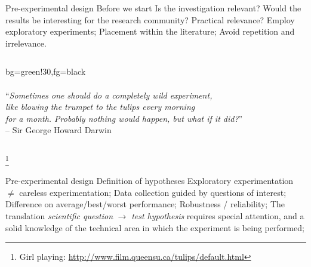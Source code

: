 \documentclass[t]{beamer}
\begin{document}
\begin{ftst}
{Pre-experimental design}
{Before we start}
\bitems Is the investigation relevant?
	\spitem Would the results be interesting for the research community?
	\spitem Practical relevance?
	\bitems Employ exploratory experiments;\eitem
	\spitem Placement within the literature;
	\bitems Avoid repetition and irrelevance.\eitem
\eitem
\begin{columns}[T]
\begin{colorblock}{}{bg=green!30,fg=black}
{\ \\\ \\\scriptsize``\textit{Sometimes one should do a completely wild experiment,\\like blowing the trumpet to the tulips every morning\\for a month. Probably nothing would happen, but what if it did?}''\\}
{\tiny -- Sir George Howard Darwin}
\end{colorblock}
\end{columns}
\let\thefootnote\relax\footnote{\tiny Girl playing: \url{http://www.film.queensu.ca/tulips/default.html}}
\end{ftst}


\begin{ftst}
{Pre-experimental design}
{Definition of hypotheses}
\bitems Exploratory experimentation $\neq$ careless experimentation;
	\spitem Data collection guided by questions of interest;
	\bitems Difference on average/best/worst performance;
		\spitem Robustness / reliability;
	\eitem
	\spitem The translation \textit{scientific question} $\rightarrow$ \textit{test hypothesis} requires special attention, and a solid knowledge of the technical area in which the experiment is being performed;
\eitem
\end{ftst}

\end{document}
